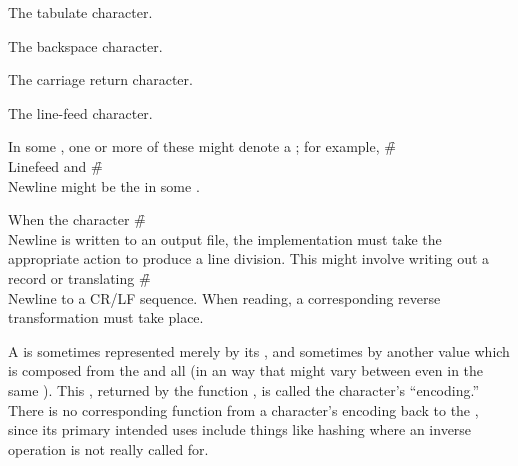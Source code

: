 
The tabulate character.


The backspace character.


The carriage return character.


The line-feed character.
\endlist

In some ,
one or more of these   
might denote a ; 
for example,
\f{\#\\Linefeed} and \f{\#\\Newline} might be the  
in some .


\endsubsection%


When the character \f{\#\\Newline} is written to an output file,
the implementation must take the appropriate action
to produce a line division.  This might involve writing out a
record or translating \f{\#\\Newline} to a CR/LF sequence.
When reading, a corresponding reverse transformation must take place.

\endsubSection%


A  is sometimes represented merely by its , and sometimes
by another  value which is composed from the  and all 
 
(in an  way
that might vary between  even in the same ).
This , returned by the function , is called the
character's ``encoding.''
There is no corresponding function
from a character's encoding back to the , 
since its primary intended uses include things like hashing where an inverse operation
is not really called for.

